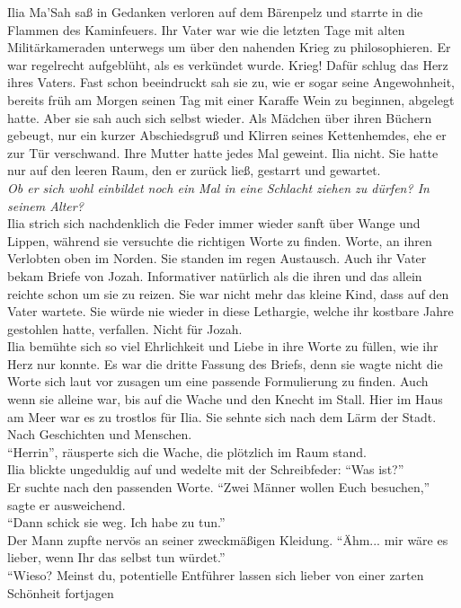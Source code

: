 Ilia Ma'Sah saß in Gedanken verloren auf dem Bärenpelz und starrte in die Flammen des Kaminfeuers. 
Ihr Vater war wie die letzten Tage mit alten Militärkameraden unterwegs um über den 
nahenden Krieg zu philosophieren. Er war regelrecht aufgeblüht, als es verkündet wurde. 
Krieg! Dafür schlug das Herz ihres Vaters. Fast schon beeindruckt sah sie zu, wie er sogar seine 
Angewohnheit, bereits früh am Morgen seinen Tag mit einer Karaffe Wein zu beginnen, abgelegt 
hatte. Aber sie sah auch sich selbst wieder. Als Mädchen über ihren Büchern gebeugt, nur ein 
kurzer Abschiedsgruß und Klirren seines Kettenhemdes, ehe er zur Tür verschwand. Ihre Mutter hatte 
jedes Mal geweint. Ilia nicht. Sie hatte nur auf den leeren Raum, den er zurück ließ, gestarrt und 
gewartet.\\
\textit{Ob er sich wohl einbildet noch ein Mal in eine Schlacht ziehen zu dürfen? In seinem 
Alter?}\\
Ilia strich sich nachdenklich die Feder immer wieder sanft über Wange und Lippen, während sie 
versuchte die richtigen Worte zu finden. Worte, an ihren Verlobten oben im Norden. Sie standen 
im regen Austausch. Auch ihr Vater bekam Briefe von Jozah. Informativer natürlich als die ihren 
und das allein reichte schon um sie zu reizen. Sie war nicht mehr das kleine Kind, dass auf den 
Vater wartete. Sie würde nie wieder in diese Lethargie, welche ihr kostbare Jahre gestohlen 
hatte, verfallen. Nicht für Jozah.\\
Ilia bemühte sich so viel Ehrlichkeit und Liebe in ihre Worte zu füllen, wie ihr Herz nur konnte. Es 
war die dritte Fassung des Briefs, denn sie wagte nicht die Worte sich laut vor zusagen um eine 
passende Formulierung zu finden. Auch wenn sie alleine war, bis auf die Wache und den Knecht im 
Stall. Hier im Haus am Meer war es zu trostlos für Ilia. Sie sehnte sich nach dem Lärm der Stadt. 
Nach Geschichten und Menschen.\\
``Herrin'', räusperte sich die Wache, die plötzlich im Raum stand.\\
Ilia blickte ungeduldig auf und wedelte mit der Schreibfeder: ``Was ist?''\\
Er suchte nach den passenden Worte. ``Zwei Männer wollen Euch besuchen,'' sagte er ausweichend.\\
``Dann schick sie weg. Ich habe zu tun.''\\
Der Mann zupfte nervös an seiner zweckmäßigen Kleidung. ``Ähm... mir wäre es lieber, wenn Ihr das 
selbst tun würdet.''\\
``Wieso? Meinst du, potentielle Entführer lassen sich lieber von einer zarten Schönheit fortjagen 
